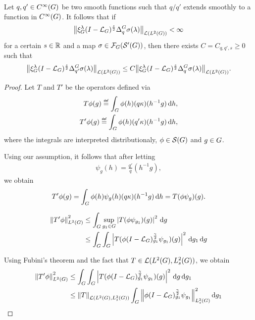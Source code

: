 \begin{lemma}
    Let $q, q' \in \SmoothFunctions \Group$ be two smooth functions such that $q / q'$ extends smoothly to a function in $\SmoothFunctions \Group$.
    It follows that if
    \begin{align*}
        \norm [\Lin {\Lebesgue 2 \Group}] {\Rep \lambda \BesselPotential s \DifferenceOperator q \sigma(\lambda)}
        < \infty
    \end{align*}
    for a certain $s \in \R$ and a map $\sigma \in \Fourier(\TemperedDistributions \Group)$,
    then there exists $C = C_{q, q', s} \geq 0$ such that
    \begin{align*}
        \norm [\Lin {\Lebesgue 2 \Group}] {\Rep \lambda \BesselPotential s \DifferenceOperator {q'} \sigma(\lambda)}
        \leq C
        \norm [\Lin {\Lebesgue 2 \Group}] {\Rep \lambda \BesselPotential s \DifferenceOperator q \sigma(\lambda)}.
    \end{align*}
\end{lemma}
\begin{proof}
    Let $T$ and $T'$ be the operators defined via
    \begin{align*}
        T \phi(g) \defeq \int_\Group \phi(h) (q \kappa)(h^{-1} g) \dd h,\\
        T' \phi(g) \defeq \int_\Group \phi(h) (q' \kappa)(h^{-1} g) \dd h,
    \end{align*}
    where the integrals are interpreted distributionaly,
    $\phi \in \Schwartz \Group$ and $g \in \Group$.

    Using our assumption,
    it follows that after letting
    \begin{align*}
        \psi_g(h) = \frac {q'} q(h^{-1} g),
    \end{align*}
    we obtain
    \begin{align*}
        T' \phi(g) = \int_\Group \phi(h) \psi_g(h) (q \kappa)(h^{-1} g) \dd h = T(\phi \psi_g)(g).
    \end{align*}

    \begin{align*}
        \norm [\Lebesgue 2 \Group] {T' \phi}^2
        &\leq \int_\Group \sup_{g_1 \in \Group} \abs{T (\phi \psi_{g_1})(g)}^2 \dd g\\
        &\leq \int_\Group \int_\Group \abs{T (\phi \BesselPotential \gamma_{g_1} \psi_{g_1})(g)}^2 \dd g_1 \dd g
    \end{align*}

    Using Fubini's theorem
    and the fact that $T \in \Lin{\Lebesgue 2 \Group, \Sobolev s}$,
    we obtain
    \begin{align*}
        \norm [\Lebesgue 2 \Group] {T' \phi}^2
        &\leq \int_\Group \int_\Group \abs{T (\phi \BesselPotential \gamma_{g_1} \psi_{g_1})(g)}^2 \dd g \dd g_1\\
        &\leq \norm [\Lin {\Lebesgue 2 \Group, \Sobolev s}] {T} \int_\Group \norm [\Sobolev s] {\phi \BesselPotential \gamma_{g_1} \psi_{g_1}}^2 \dd g_1
    \end{align*}
\end{proof}


